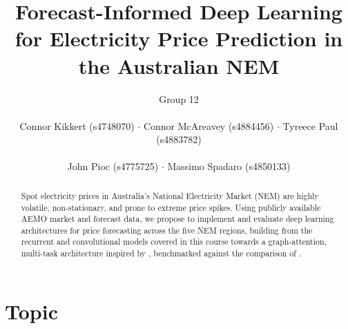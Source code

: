 \documentclass[a4paper,11pt]{article} %
\begin{document}
\title{Forecast-Informed Deep Learning for Electricity Price Prediction in the Australian NEM}

\author{Group 12 \\\\
Connor Kikkert (s4748070) $\cdot$
Connor McAreavey (s4884456) $\cdot$
Tyreece Paul (s4883782) \\\\
John Pioc (s4775725) $\cdot$ Massimo Spadaro (s4850133)}

\date{}
\maketitle

\begin{abstract}
Spot electricity prices in Australia's National Electricity Market (NEM) are highly
volatile, non-stationary, and prone to extreme price spikes. Using publicly available
AEMO market and forecast data, we propose to implement and evaluate deep learning
architectures for price forecasting across the five NEM regions, building from the
recurrent and convolutional models covered in this course towards a graph-attention,
multi-task architecture inspired by \citet{li2025mgaal}, benchmarked against the
comparison of \citet{gani2026deeptime}.
\end{abstract}

\section{Topic}
\end{document}
